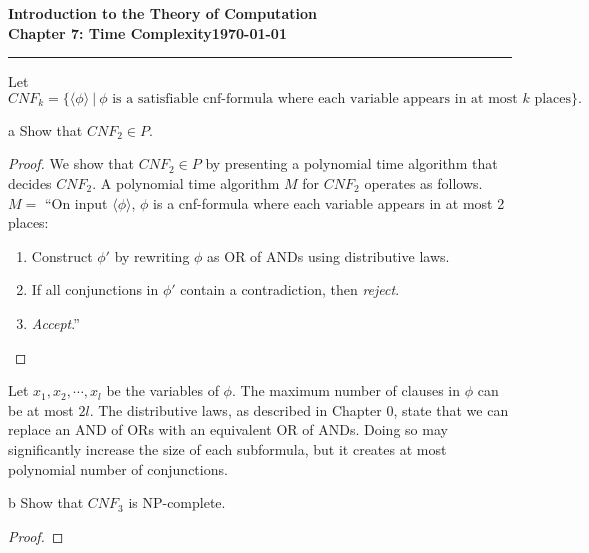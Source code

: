 \documentclass[11pt]{article}
\newcommand{\dated}{\today}
\begin{document}
\textbf{Introduction to the Theory of
Computation}\hfill\textbf{\myname}\\[0.01in]
\textbf{Chapter 7: Time Complexity}\hfill\textbf{\dated}\\
\smallskip\hrule\bigskip

\begin{problem}{7.24}
Let
\[
CNF_k = \{\langle \phi \rangle \ | \ \phi \text{ is a satisfiable cnf-formula where each variable appears in at most } k \text{ places}\}.
\]
\end{problem}

\begin{problem}[Part]{a}
Show that $CNF_2 \in P$.
\end{problem}

\begin{proof}
We show that $CNF_2 \in P$ by presenting a polynomial time algorithm that decides $CNF_2$. A polynomial time algorithm $M$ for $CNF_2$ operates as follows. \\

$M =$ \textquotedblleft On input $\langle \phi \rangle$, $\phi$ is a cnf-formula where each variable appears in at most 2 places:
\begin{enumerate}
\item Construct $\phi'$ by rewriting $\phi$ as OR of ANDs using distributive laws.
\item If all conjunctions in $\phi'$ contain a contradiction, then \textit{reject}.
\item \textit{Accept}.\textquotedblright
\end{enumerate}
\end{proof}

Let $x_1, x_2, \cdots, x_l$ be the variables of $\phi$. The maximum number of clauses in $\phi$ can be at most $2l$. The distributive laws, as described in Chapter 0, state that we can replace an AND of ORs with an equivalent OR of ANDs. Doing so may significantly increase the size of each subformula, but it creates at most polynomial number of conjunctions.

\begin{problem}[Part]{b}
Show that $CNF_3$ is NP-complete.
\end{problem}

\begin{proof}
\end{proof}
\end{document}
